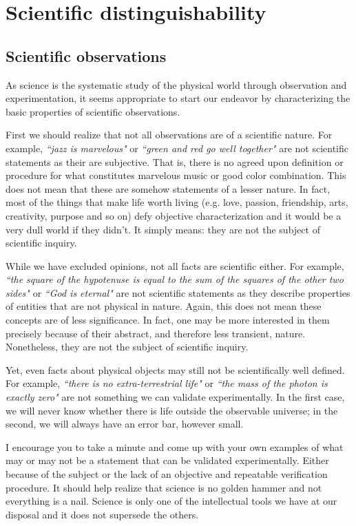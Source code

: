 \documentclass[11pt,letterpaper,fleqn]{memoir} %
\begin{document}
	
\chapter{Scientific distinguishability}

\section{Scientific observations}

As science is the systematic study of the physical world through observation and experimentation, it seems appropriate to start our endeavor by characterizing the basic properties of scientific observations.

First we should realize that not all observations are of a scientific nature. For example, \emph{``jazz is marvelous"} or \emph{``green and red go well together"} are not scientific statements as their are subjective. That is, there is no agreed upon definition or procedure for what constitutes marvelous music or good color combination. This does not mean that these are somehow statements of a lesser nature. In fact, most of the things that make life worth living (e.g. love, passion, friendship, arts, creativity, purpose and so on) defy objective characterization and it would be a very dull world if they didn't. It simply means: they are not the subject of scientific inquiry.

While we have excluded opinions, not all facts are scientific either. For example, \emph{``the square of the hypotenuse is equal to the sum of the squares of the other two sides"} or \emph{``God is eternal"} are not scientific statements as they describe properties of entities that are not physical in nature. Again, this does not mean these concepts are of less significance. In fact, one may be more interested in them precisely because of their abstract, and therefore less transient, nature. Nonetheless, they are not the subject of scientific inquiry.

Yet, even facts about physical objects may still not be scientifically well defined. For example, \emph{``there is no extra-terrestrial life"} or \emph{``the mass of the photon is exactly zero"} are not something we can validate experimentally. In the first case, we will never know whether there is life outside the observable universe; in the second, we will always have an error bar, however small.

I encourage you to take a minute and come up with your own examples of what may or may not be a statement that can be validated experimentally. Either because of the subject or the lack of an objective and repeatable verification procedure. It should help realize that science is no golden hammer and not everything is a nail. Science is only one of the intellectual tools we have at our disposal and it does not supersede the others.
\end{document}
